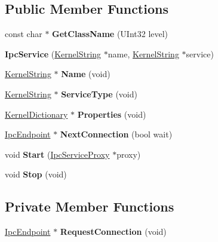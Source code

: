 \subsection*{Public Member Functions}
\begin{DoxyCompactItemize}
\item 
\mbox{\label{class_ipc_service_a46fb059ab216115f3efd7f028bbab2c4}} 
const char $\ast$ {\bfseries Get\+Class\+Name} (U\+Int32 level)
\item 
\mbox{\label{class_ipc_service_a8890c42050eb8b5cd8f3da28ce3b8426}} 
{\bfseries Ipc\+Service} (\hyperlink{class_kernel_string}{Kernel\+String} $\ast$name, \hyperlink{class_kernel_string}{Kernel\+String} $\ast$service)
\item 
\mbox{\label{class_ipc_service_a61415ab1329973de3594c1124644d1eb}} 
\hyperlink{class_kernel_string}{Kernel\+String} $\ast$ {\bfseries Name} (void)
\item 
\mbox{\label{class_ipc_service_ad3eb36cb050250883398602298c1f76e}} 
\hyperlink{class_kernel_string}{Kernel\+String} $\ast$ {\bfseries Service\+Type} (void)
\item 
\mbox{\label{class_ipc_service_a39feb505958bdba346a38dbea3e1bb94}} 
\hyperlink{class_kernel_dictionary}{Kernel\+Dictionary} $\ast$ {\bfseries Properties} (void)
\item 
\mbox{\label{class_ipc_service_a168b5ab8b55306db01659be94d576fdd}} 
\hyperlink{class_ipc_endpoint}{Ipc\+Endpoint} $\ast$ {\bfseries Next\+Connection} (bool wait)
\item 
\mbox{\label{class_ipc_service_a9fc25c44f34831ec0df4fc20981ddc2a}} 
void {\bfseries Start} (\hyperlink{class_ipc_service_proxy}{Ipc\+Service\+Proxy} $\ast$proxy)
\item 
\mbox{\label{class_ipc_service_aa6bd186a1b01401ba8a0bd60e7eb1d5f}} 
void {\bfseries Stop} (void)
\end{DoxyCompactItemize}
\subsection*{Private Member Functions}
\begin{DoxyCompactItemize}
\item 
\mbox{\label{class_ipc_service_a436343998618e888fcc921675a600ed5}} 
\hyperlink{class_ipc_endpoint}{Ipc\+Endpoint} $\ast$ {\bfseries Request\+Connection} (void)
\end{DoxyCompactItemize}
